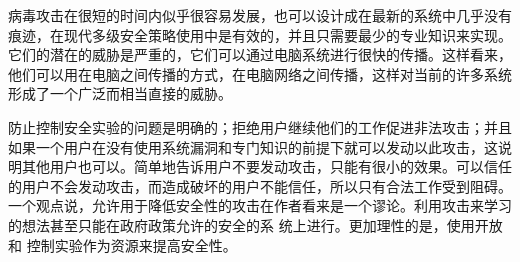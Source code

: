 病毒攻击在很短的时间内似乎很容易发展，也可以设计成在最新的系统中几乎没有痕迹，在现代多级安全策略使用中是有效的，并且只需要最少的专业知识来实现。它们的潜在的威胁是严重的，它们可以通过电脑系统进行很快的传播。这样看来，他们可以用在电脑之间传播的方式，在电脑网络之间传播，这样对当前的许多系统形成了一个广泛而相当直接的威胁。


防止控制安全实验的问题是明确的；拒绝用户继续他们的工作促进非法攻击；并且如果一个用户在没有使用系统漏洞和专门知识的前提下就可以发动以此攻击，这说明其他用户也可以。简单地告诉用户不要发动攻击，只能有很小的效果。可以信任的用户不会发动攻击，而造成破坏的用户不能信任，所以只有合法工作受到阻碍。一个观点说，允许用于降低安全性的攻击在作者看来是一个谬论。利用攻击来学习的想法甚至只能在政府政策允许的安全的系
统上进行。更加理性的是，使用开放和
控制实验作为资源来提高安全性。


